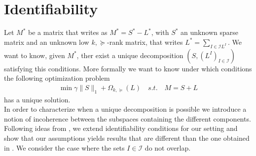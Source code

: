 \section{Identifiability}
\label{sec:id}
Let  $M^{\ast}$ be a matrix that writes as  $M^{\ast}= S^{\ast}-L^{\ast}$, with $S^{\ast}$ an unknown sparse matrix and an unknown  low $k,\succeq$-rank matrix, that writes  $L^{\ast}=\sum_{I\in\mathcal{I}L^{I}}$. We want to know, given $M^{\ast}$, ther exist a unique decomposition $\left(S,(L^{I})_{I\in\mathcal{I}}\right)$ satisfying this conditions. More formally we want to know under which conditions the following optimization problem 
\begin{align}
\min \gamma\|S\|_1+\Omega_{k,\succeq}(L) \quad s.t. \quad M=S+L
\end{align}
has a unique solution.\\
In order to characterize when a unique decomposition is possible we introduce a notion of incoherence between the subspaces containing the different components. Following ideas from \citet{chandrasekaran2011rank}, we extend identifiability conditions for our setting and show that  our assumptions yields results that are different than the one obtained in \citet{chandrasekaran2011rank}. We consider the case where the sets $I\in\mathcal{I}$ do not overlap. 
